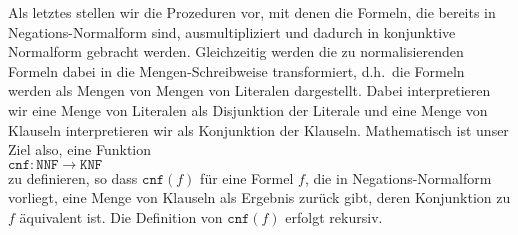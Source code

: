 Als letztes stellen wir die Prozeduren vor, mit denen die Formeln, die bereits in
Negations-Normalform sind, ausmultipliziert und dadurch in konjunktive
Normalform gebracht werden.  Gleichzeitig werden  die zu normalisierenden Formeln dabei
in die Mengen-Schreibweise transformiert, d.h.~die Formeln werden als Mengen von Mengen 
von Literalen dargestellt.  Dabei interpretieren wir eine Menge von Literalen als
Disjunktion der Literale und eine Menge von Klauseln interpretieren wir als Konjunktion
der Klauseln.  Mathematisch ist unser Ziel also, eine Funktion
\\[0.2cm]
\hspace*{1.3cm}
$\texttt{cnf}: \texttt{NNF} \rightarrow \texttt{KNF}$
\\[0.2cm]
zu definieren, so dass $\texttt{cnf}(f)$ für eine Formel $f$, die in Negations-Normalform vorliegt, eine Menge von Klauseln als
Ergebnis zurück gibt, deren Konjunktion zu $f$ äquivalent ist.  Die Definition von $\texttt{cnf}(f)$ erfolgt
rekursiv.
